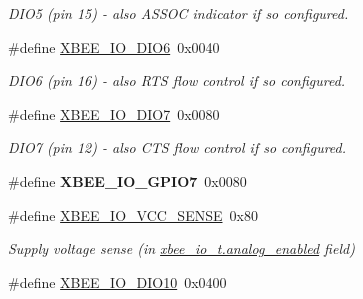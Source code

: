 \begin{DoxyCompactItemize}
\begin{DoxyCompactList}\small\item\em D\-I\-O5 (pin 15) -\/ also A\-S\-S\-O\-C indicator if so configured. \end{DoxyCompactList}\item 
\hypertarget{group__xbee__io_ga1e1b537e3a643c8f79098d8f490f433e}{\#define \hyperlink{group__xbee__io_ga1e1b537e3a643c8f79098d8f490f433e}{X\-B\-E\-E\-\_\-\-I\-O\-\_\-\-D\-I\-O6}~0x0040}\label{group__xbee__io_ga1e1b537e3a643c8f79098d8f490f433e}

\begin{DoxyCompactList}\small\item\em D\-I\-O6 (pin 16) -\/ also R\-T\-S flow control if so configured. \end{DoxyCompactList}\item 
\hypertarget{group__xbee__io_ga6255aa73ee149d14f2adb45112124dc1}{\#define \hyperlink{group__xbee__io_ga6255aa73ee149d14f2adb45112124dc1}{X\-B\-E\-E\-\_\-\-I\-O\-\_\-\-D\-I\-O7}~0x0080}\label{group__xbee__io_ga6255aa73ee149d14f2adb45112124dc1}

\begin{DoxyCompactList}\small\item\em D\-I\-O7 (pin 12) -\/ also C\-T\-S flow control if so configured. \end{DoxyCompactList}\item 
\hypertarget{group__xbee__io_gaa33d3e911aa351342fb8a28a0bdae41f}{\#define {\bfseries X\-B\-E\-E\-\_\-\-I\-O\-\_\-\-G\-P\-I\-O7}~0x0080}\label{group__xbee__io_gaa33d3e911aa351342fb8a28a0bdae41f}

\item 
\hypertarget{group__xbee__io_gae8044e1e12773287a7d433b23bba560b}{\#define \hyperlink{group__xbee__io_gae8044e1e12773287a7d433b23bba560b}{X\-B\-E\-E\-\_\-\-I\-O\-\_\-\-V\-C\-C\-\_\-\-S\-E\-N\-S\-E}~0x80}\label{group__xbee__io_gae8044e1e12773287a7d433b23bba560b}

\begin{DoxyCompactList}\small\item\em Supply voltage sense (in \hyperlink{group__xbee__io_ga8473837f97f54ee29f09cd8f9c15e084}{xbee\-\_\-io\-\_\-t.\-analog\-\_\-enabled} field) \end{DoxyCompactList}\item 
\hypertarget{group__xbee__io_gaf960c0d984f3b75ecfcae16ccbb5f3b8}{\#define \hyperlink{group__xbee__io_gaf960c0d984f3b75ecfcae16ccbb5f3b8}{X\-B\-E\-E\-\_\-\-I\-O\-\_\-\-D\-I\-O10}~0x0400}\label{group__xbee__io_gaf960c0d984f3b75ecfcae16ccbb5f3b8}


\end{DoxyCompactItemize}
